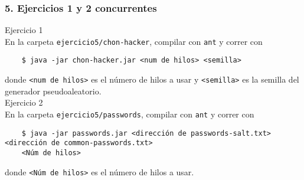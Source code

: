 \documentclass[14pt]{article}
\begin{document}
\subsubsection*{5. Ejercicios 1 y 2 concurrentes}
\textsf{Ejercicio 1} \\
En la carpeta \texttt{ejercicio5/chon-hacker}, compilar con \texttt{ant} y correr con
\begin{verbatim}
    $ java -jar chon-hacker.jar <num de hilos> <semilla>
\end{verbatim}
donde \texttt{<num de hilos>} es el número de hilos a usar y \texttt{<semilla>} es la semilla del generador pseudoaleatorio. \\

\textsf{Ejercicio 2} \\
En la carpeta \texttt{ejercicio5/passwords}, compilar con \texttt{ant} y correr con
\begin{verbatim}
    $ java -jar passwords.jar <dirección de passwords-salt.txt> <dirección de common-passwords.txt> 
    <Núm de hilos>
\end{verbatim}
donde \texttt{<Núm de hilos>} es el número de hilos a usar.
\end{document}
